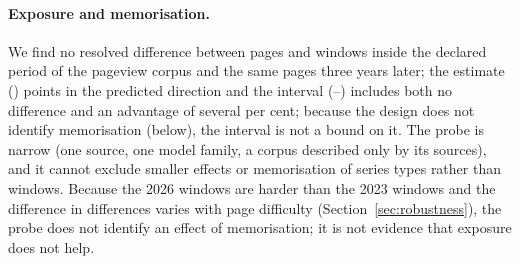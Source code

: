 \paragraph{Exposure and memorisation.} We find no resolved difference between pages and windows inside the declared period of the pageview corpus
and the same pages three years later; the estimate (\Htwo) points in the predicted direction and the interval
(\HtwoLo--\HtwoHi) includes both no difference and an advantage of several per cent; because the design does not identify
memorisation (below), the interval is not a bound on it. The probe is narrow (one source, one model family, a corpus
described only by its sources), and it cannot exclude smaller effects or memorisation of series types rather than windows. Because the 2026 windows are harder than the 2023 windows and the difference in differences varies with page difficulty
(Section~\ref{sec:robustness}), the probe does not identify an effect of memorisation; it is not evidence that exposure does not help.

